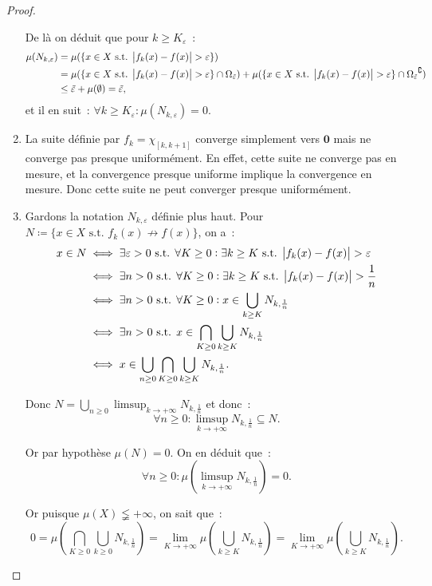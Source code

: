 \documentclass{article}
\newcommand{\pinfty}{{+\infty}}
\newcommand{\st}{\text{ s.t. }}
\newcommand{\C}{\complement}
\begin{document}
\begin{proof}
\begin{enumerate}
	De là on déduit que pour $k \geq K_\varepsilon$~:
	\begin{align*}
		\mu(N_{k,\varepsilon}) &= \mu(\{x \in X \st \abs {f_k(x)-f(x)} > \varepsilon\}) \\
		&= \mu(\{x \in X \st \abs {f_k(x)-f(x)} > \varepsilon\} \cap \Omega_{\tilde \varepsilon})
			+ \mu(\{x \in X \st \abs {f_k(x)-f(x)} > \varepsilon\} \cap {\Omega_{\tilde \varepsilon}}^\C) \\
		&\leq \tilde \varepsilon + \mu(\emptyset) = \tilde \varepsilon,
	\end{align*}
	et il en suit~: $\forall k \geq K_\varepsilon : \mu(N_{k,\varepsilon}) = 0$.

	\item La suite définie par $f_k = \chi_{[k, k+1]}$ converge simplement vers $\mathbf 0$ mais ne converge pas presque uniformément. En effet, cette suite ne converge pas en mesure,
	et la convergence presque uniforme implique la convergence en mesure. Donc cette suite ne peut converger presque uniformément.

	\item Gardons la notation $N_{k,\varepsilon}$ définie plus haut. Pour $N \coloneqq \{x \in X \st f_k(x) \not \to f(x)\}$, on a~:
	\begin{align*}
		x \in N &\iff \exists \varepsilon > 0 \st \forall K \geq 0 : \exists k \geq K \st \abs {f_k(x)-f(x)} > \varepsilon \\
		&\iff \exists n > 0 \st \forall K \geq 0 : \exists k \geq K \st \abs {f_k(x)-f(x)} > \frac 1n \\
		&\iff \exists n > 0 \st \forall K \geq 0 : x \in \bigcup_{k \geq K}N_{k,\frac 1n} \\
		&\iff \exists n > 0 \st x \in \bigcap_{K \geq 0}\bigcup_{k \geq K}N_{k,\frac 1n} \\
		&\iff x \in \bigcup_{n \geq 0} \bigcap_{K \geq 0}\bigcup_{k \geq K}N_{k,\frac 1n}.
	\end{align*}

	Donc $N = \bigcup_{n \geq 0}\limsup_{k \to \pinfty}N_{k,\frac 1n}$ et donc~:
	\[\forall n \geq 0 : \limsup_{k \to \pinfty}N_{k,\frac 1n} \subseteq N.\]

	Or par hypothèse $\mu(N) = 0$. On en déduit que~:
	\[\forall n \geq 0 : \mu(\limsup_{k \to \pinfty}N_{k,\frac 1n}) = 0.\]

	Or puisque $\mu(X) \lneqq \pinfty$, on sait que~:
	\[0 = \mu\left(\bigcap_{K \geq 0}\bigcup_{k \geq 0}N_{k,\frac 1n}\right) = \lim_{K \to \pinfty}\mu\left(\bigcup_{k \geq K}N_{k,\frac 1n}\right)
	= \lim_{K \to \pinfty}\mu\left(\bigcup_{k \geq K}N_{k,\frac 1n}\right).\]


\end{enumerate}
\end{proof}
\end{document}
